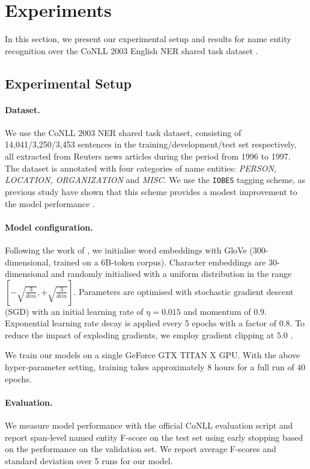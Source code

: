 \section{Experiments}

In this section, we present our experimental setup and results for name entity recognition over the CoNLL 2003 English NER shared task dataset \cite{tjong2003introduction}. 

\subsection{Experimental Setup}
\paragraph{Dataset.} 
We use the CoNLL 2003 NER shared task dataset, consisting of 14,041/3,250/3,453 sentences in the training/development/test set respectively, all extracted from Reuters news articles during the period from 1996 to 1997. 
The dataset is annotated with four categories of name entities: \textit{PERSON, LOCATION, ORGANIZATION} and \textit{MISC}. 
We use the \texttt{IOBES} tagging scheme, as previous study have shown that this scheme provides a modest improvement to the model performance \cite{ratinov2009design, chiu2016named, lample2016neural, ma2016end}.

\paragraph{Model configuration.}
Following the work of , we initialise word embeddings with GloVe \cite{pennington2014glove} ($300$-dimensional, trained on a 6B-token corpus).
Character embeddings are $30$-dimensional and randomly initialised with a uniform distribution in the range $[-\sqrt{\frac{3}{dim}}, +\sqrt{\frac{3}{dim}}]$.
Parameters are optimised with stochastic gradient descent (SGD) with an initial learning rate of $\eta = 0.015$ and momentum of $0.9$. 
Exponential learning rate decay is applied every 5 epochs with a factor of $0.8$. 
To reduce the impact of exploding gradients, we employ gradient clipping at $5.0$ \cite{pascanu2013difficulty}. 

We train our models on a single GeForce GTX TITAN X GPU.
With the above hyper-parameter setting, training takes approximately $8$ hours for a full run of $40$ epochs.

\paragraph{Evaluation.} 
We measure model performance with the official CoNLL evaluation script and report span-level named entity F-score on the test set using early stopping based on the performance on the validation set. 
We report average F-scores and standard deviation over 5 runs for our model.

